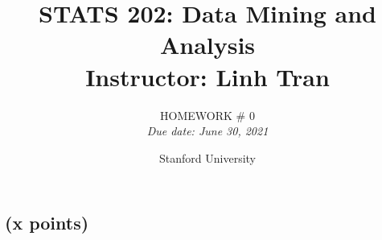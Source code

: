 \documentclass{article}
\title{
  STATS 202: Data Mining and Analysis \\
  \large Instructor: Linh Tran
}
\author{
  HOMEWORK \# 0 \\
  \textit{Due date: June 30, 2021}
}
\date{\textcolor{cardinalred}{Stanford University}}
\begin{document}
\maketitle

\subsection{(x points)}



\end{document}
